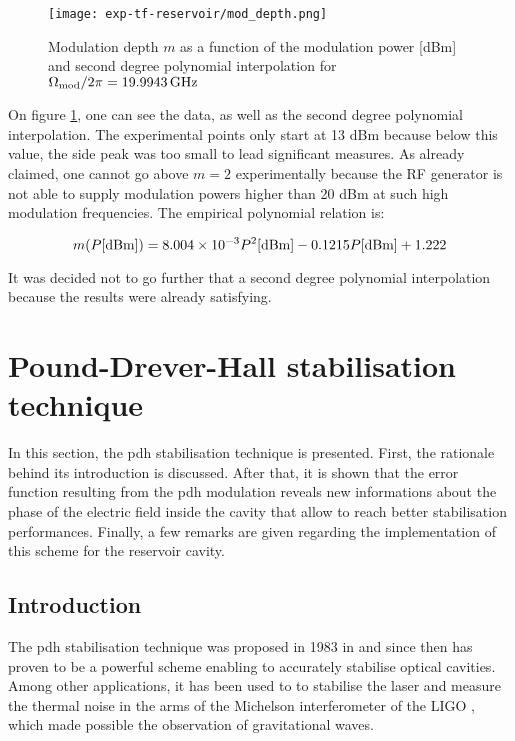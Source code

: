 \begin{figure}
	\centering
	\texttt{[image: exp-tf-reservoir/mod\_depth.png]}
	\caption{Modulation depth $m$ as a function of the modulation power [dBm] and second degree polynomial interpolation for $\Omega_{\text{mod}}/2\pi=\SI{19.9943}{\giga\hertz}$}
	\label{mod_depth}
\end{figure}

On figure \ref{mod_depth}, one can see the data, as well as the second degree polynomial interpolation. The experimental points only start at 13 dBm because below this value, the side peak was too small to lead significant measures. As already claimed, one cannot go above $m = 2$ experimentally because the RF generator is not able to supply modulation powers higher than 20 dBm at such high modulation frequencies. The empirical polynomial relation is:

\begin{equation}
	m(P[\textrm{dBm}]) = \num{8.004d-3} P^2[\textrm{dBm}] - 0.1215 P[\textrm{dBm}] + 1.222
\end{equation}

It was decided not to go further that a second degree polynomial interpolation because the results were already satisfying.


\section{Pound-Drever-Hall stabilisation technique}

\label{sec-pdh}

In this section, the \gls{pdh} stabilisation technique is presented. First, the rationale behind its introduction is discussed. After that, it is shown that the error function resulting from the \gls{pdh} modulation reveals new informations about the phase of the electric field inside the cavity that allow to reach better stabilisation performances. Finally, a few remarks are given regarding the implementation of this scheme for the reservoir cavity.


\subsection{Introduction}

The \gls{pdh} stabilisation technique was proposed in 1983 in \cite{drever1983laser} and since then has proven to be a powerful scheme enabling to accurately stabilise optical cavities. Among other applications, it has been used to to stabilise the laser and measure the thermal noise in the arms of the Michelson interferometer of the LIGO \cite{black1998notes}, which made possible the observation of gravitational waves.\\

